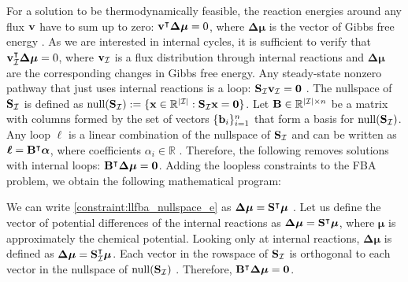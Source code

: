 For a solution to be thermodynamically feasible, the reaction energies around any flux $\bold v$ have to sum up to zero: $\bold v^\intercal \boldsymbol{\Delta \mu} = 0$, where $\boldsymbol{\Delta \mu}$ is the vector of Gibbs free energy \cite{elimination_infeasible_loops}. As we are interested in internal cycles, it is sufficient to verify that $\bold v_\mathcal{I}^\intercal \boldsymbol{\Delta \mu} =0$, where $\bold v_\mathcal{I}$ is a flux distribution through internal reactions and $\boldsymbol{\Delta \mu}$ are the corresponding changes in Gibbs free energy.
Any steady-state nonzero pathway that just uses internal reactions is a loop: $\bold S_{\mathcal{I}} \bold v_{\mathcal{I}} = \bold 0$ \cite{noor_proof_2012}. The nullspace of $\bold S_{\mathcal{I}}$ is defined as $\mathrm{null}(\bold S_{\mathcal{I}}) := \{\bold x \in \mathbb{R}^{|\mathcal{I}|} : \bold S_{\mathcal{I}} \bold x = \bold 0 \}$. Let $\bold B \in \mathbb{R}^{|\mathcal{I}| \times n}$ be a matrix with columns formed by the set of vectors $\{\bold b_i\}_{i=1}^n$ that form a basis for $\mathrm{null}(\bold S_{\mathcal{I}})$.
Any loop $\boldsymbol \ell$ is a linear combination of the nullspace of $\bold S_{\mathcal{I}}$ and can be written as $\boldsymbol \ell = \bold B ^\intercal \boldsymbol \alpha$, where coefficients $\alpha_i \in \mathbb{R}$ \cite{elimination_infeasible_loops}. Therefore, the following removes solutions with internal loops: $\bold B^\intercal \boldsymbol{\Delta \mu} = \bold 0$. Adding the loopless constraints to the FBA problem, we obtain the following mathematical program:

We can write \cref{constraint:llfba_nullspace_e} as $\boldsymbol{\Delta \mu} = \bold S ^\intercal \boldsymbol \mu$ \cite{noor_proof_2012, elimination_infeasible_loops, muller_fast_2013}. Let us define the vector of potential differences of the internal reactions as $\boldsymbol{\Delta \mu} = \bold S ^\intercal \boldsymbol \mu$, where $\boldsymbol \mu$ is approximately the chemical potential. Looking only at internal reactions, $\boldsymbol{\Delta \mu}$ is defined as $\boldsymbol{\Delta \mu} = \bold S_\mathcal{I}^\intercal \boldsymbol \mu$.  
Each vector in the rowspace of $\bold S_{\mathcal{I}}$ is orthogonal to each vector in the nullspace of $\mathrm{null}(\bold S_{\mathcal{I}})$ \cite{noor_proof_2012}.
Therefore, $\bold B^\intercal \boldsymbol{\Delta \mu} = \bold 0$. 

